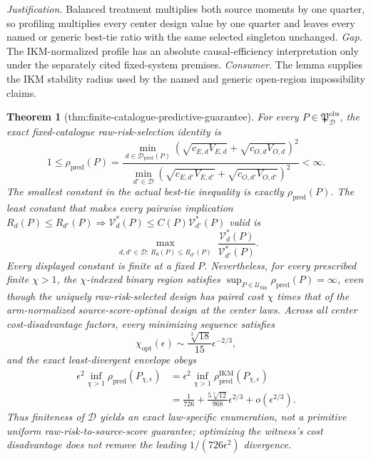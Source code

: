 \documentclass{article}
\newtheorem{theorem}{Theorem}
\begin{document}
\par\smallskip\noindent \textit{Justification.} Balanced treatment multiplies both source moments by one quarter, so profiling multiplies every center design value by one quarter and leaves every named or generic best-tie ratio with the same selected singleton unchanged. \textit{Gap.} The IKM-normalized profile has an absolute causal-efficiency interpretation only under the separately cited fixed-system premises. \textit{Consumer.} The lemma supplies the IKM stability radius used by the named and generic open-region impossibility claims.

\begin{theorem}[thm:finite-catalogue-predictive-guarantee]\label{thm:finite-catalogue-predictive-guarantee}
For every \(P\in\mathfrak P_{\mathcal D}^{\mathrm{obs}}\), the exact fixed-catalogue raw-risk-selection identity is
\[
 1\le\rho_{\mathrm{pred}}(P)
 =\frac{\min_{d\in\mathcal D_{\mathrm{pred}}(P)}
 (\sqrt{c_{E,d}V_{E,d}}+\sqrt{c_{O,d}V_{O,d}})^2}
 {\min_{d'\in\mathcal D}
 (\sqrt{c_{E,d'}V_{E,d'}}+\sqrt{c_{O,d'}V_{O,d'}})^2}<\infty.
\]
The smallest constant in the actual best-tie inequality is exactly \(\rho_{\mathrm{pred}}(P)\). The least constant that makes every pairwise implication
\(R_d(P)\le R_{d'}(P)\Rightarrow \mathcal V_d^*(P)\le C(P)\mathcal V_{d'}^*(P)\)
valid is
\[
 \max_{\substack{d,d'\in\mathcal D:\,R_d(P)\le R_{d'}(P)}}
 \frac{\mathcal V_d^*(P)}{\mathcal V_{d'}^*(P)}.
\]
Every displayed constant is finite at a fixed \(P\). Nevertheless, for every prescribed finite \(\chi>1\), the \(\chi\)-indexed binary region satisfies \(\sup_{P\in\mathcal U_{\mathrm{bin}}}\rho_{\mathrm{pred}}(P)=\infty\), even though the uniquely raw-risk-selected design has paired cost \(\chi\) times that of the arm-normalized source-score-optimal design at the center laws. Across all center cost-disadvantage factors, every minimizing sequence satisfies
\[
 \chi_{\mathrm{opt}}(\epsilon)
 \sim\frac{\sqrt[3]{18}}{15}\epsilon^{-2/3},
\]
and the exact least-divergent envelope obeys
\[
\begin{aligned}
 \epsilon^2\inf_{\chi>1}\rho_{\mathrm{pred}}(P_{\chi,\epsilon})
 &=\epsilon^2\inf_{\chi>1}\rho_{\mathrm{pred}}^{\mathrm{IKM}}(P_{\chi,\epsilon})\\
 &=\frac1{726}+\frac{5\sqrt[3]{12}}{968}\epsilon^{2/3}
 +o(\epsilon^{2/3}).
\end{aligned}
\]
Thus finiteness of \(\mathcal D\) yields an exact law-specific enumeration, not a primitive uniform raw-risk-to-source-score guarantee; optimizing the witness's cost disadvantage does not remove the leading \(1/(726\epsilon^2)\) divergence.
\end{theorem}
\end{document}
